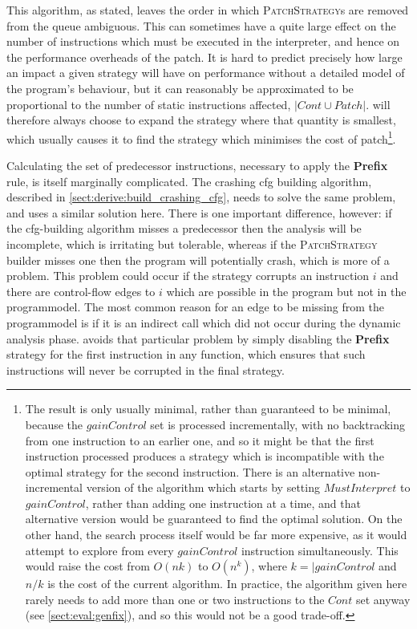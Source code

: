 This algorithm, as stated, leaves the order in which
\textsc{PatchStrategy}s are removed from the queue ambiguous.  This
can sometimes have a quite large effect on the number of instructions
which must be executed in the interpreter, and hence on the
performance overheads of the patch.  It is hard to predict precisely
how large an impact a given strategy will have on performance without
a detailed model of the program's behaviour, but it can reasonably be
approximated to be proportional to the number of static instructions
affected, $|\mathit{Cont} \cup \mathit{Patch}|$.  {\Implementation}
will therefore always choose to expand the strategy where that
quantity is smallest, which usually causes it to find the strategy
which minimises the cost of patch\footnote{The result is only usually
  minimal, rather than guaranteed to be minimal, because the
  $\mathit{gainControl}$ set is processed incrementally, with no
  backtracking from one instruction to an earlier one, and so it might
  be that the first instruction processed produces a strategy which is
  incompatible with the optimal strategy for the second instruction.
  There is an alternative non-incremental version of the algorithm
  which starts by setting $\mathit{MustInterpret}$ to
  $\mathit{gainControl}$, rather than adding one instruction at a
  time, and that alternative version would be guaranteed to find the
  optimal solution.  On the other hand, the search process itself
  would be far more expensive, as it would attempt to explore from
  every $\mathit{gainControl}$ instruction simultaneously.  This would
  raise the cost from $O(nk)$ to $O(n^k)$, where $k =
  |\mathit{gainControl}$ and $n/k$ is the cost of the current
  algorithm.  In practice, the algorithm given here rarely needs to
  add more than one or two instructions to the $\mathit{Cont}$ set
  anyway (see \autoref{sect:eval:genfix}), and so this would not be a
  good trade-off.}.

Calculating the set of predecessor instructions, necessary to apply
the \textbf{Prefix} rule, is itself marginally complicated.  The
crashing \gls{cfg} building algorithm, described in
\autoref{sect:derive:build_crashing_cfg}, needs to solve the same
problem, and {\technique} uses a similar solution here.  There is one
important difference, however: if the \gls{cfg}-building algorithm
misses a predecessor then the analysis will be incomplete, which is
irritating but tolerable, whereas if the \textsc{PatchStrategy}
builder misses one then the program will potentially crash, which is
more of a problem.  This problem could occur if the strategy corrupts
an instruction $i$ and there are control-flow edges to $i$ which are
possible in the program but not in the \gls{programmodel}.  The most
common reason for an edge to be missing from the \gls{programmodel} is
if it is an indirect call which did not occur during the dynamic
analysis phase.  {\Implementation} avoids that particular problem by
simply disabling the \textbf{Prefix} strategy for the first
instruction in any function, which ensures that such instructions will
never be corrupted in the final strategy.

